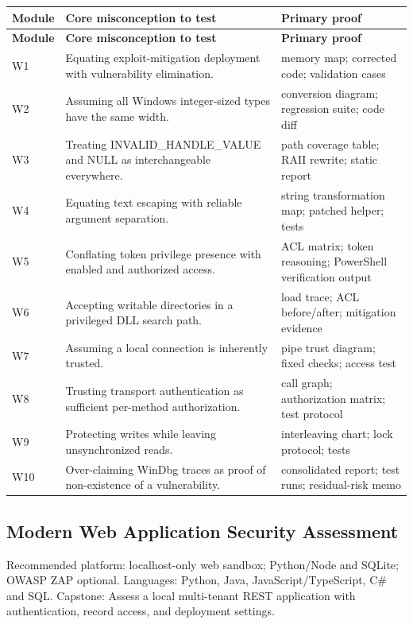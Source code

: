 \documentclass[10pt,letterpaper]{article}
\begin{document}
\begingroup\footnotesize\setlength\tabcolsep{3pt}
\begin{longtable}{>{\raggedright\arraybackslash}p{}>{\raggedright\arraybackslash}p{}>{\raggedright\arraybackslash}p{}}\toprule
\textbf{Module} & \textbf{Core misconception to test} & \textbf{Primary proof}\\\midrule\endfirsthead
\toprule \textbf{Module} & \textbf{Core misconception to test} & \textbf{Primary proof}\\\midrule\endhead
W1 & Equating exploit-mitigation deployment with vulnerability elimination. & memory map; corrected code; validation cases\\\midrule
W2 & Assuming all Windows integer-sized types have the same width. & conversion diagram; regression suite; code diff\\\midrule
W3 & Treating INVALID\_HANDLE\_VALUE and NULL as interchangeable everywhere. & path coverage table; RAII rewrite; static report\\\midrule
W4 & Equating text escaping with reliable argument separation. & string transformation map; patched helper; tests\\\midrule
W5 & Conflating token privilege presence with enabled and authorized access. & ACL matrix; token reasoning; PowerShell verification output\\\midrule
W6 & Accepting writable directories in a privileged DLL search path. & load trace; ACL before/after; mitigation evidence\\\midrule
W7 & Assuming a local connection is inherently trusted. & pipe trust diagram; fixed checks; access test\\\midrule
W8 & Trusting transport authentication as sufficient per-method authorization. & call graph; authorization matrix; test protocol\\\midrule
W9 & Protecting writes while leaving unsynchronized reads. & interleaving chart; lock protocol; tests\\\midrule
W10 & Over-claiming WinDbg traces as proof of non-existence of a vulnerability. & consolidated report; test runs; residual-risk memo\\\midrule
\bottomrule\end{longtable}\endgroup
\subsection{Modern Web Application Security Assessment}
Recommended platform: localhost-only web sandbox; Python/Node and SQLite; OWASP ZAP optional. Languages: Python, Java, JavaScript/TypeScript, C\# and SQL. Capstone: Assess a local multi-tenant REST application with authentication, record access, and deployment settings.
\end{document}
